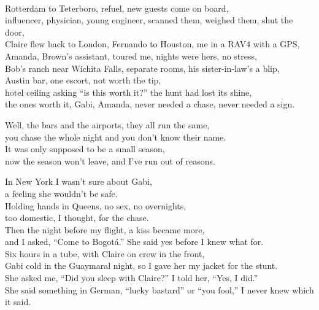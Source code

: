 \begin{lyrics}
\\
Rotterdam to Teterboro, refuel, new guests come on board,\\
influencer, physician, young engineer, scanned them, weighed them, shut the door,\\
Claire flew back to London, Fernando to Houston, me in a RAV4 with a GPS,\\
Amanda, Brown’s assistant, toured me, nights were hers, no stress,\\
Bob’s ranch near Wichita Falls, separate rooms, his sister-in-law’s a blip,\\
Austin bar, one escort, not worth the tip,\\
hotel ceiling asking “is this worth it?” the hunt had lost its shine,\\
the ones worth it, Gabi, Amanda, never needed a chase, never needed a sign.

Well, the bars and the airports, they all run the same,\\
you chase the whole night and you don’t know their name.\\
It was only supposed to be a small season,\\
now the season won’t leave, and I’ve run out of reasons.

In New York I wasn’t sure about Gabi,\\
a feeling she wouldn’t be safe.\\
Holding hands in Queens, no sex, no overnights,\\
too domestic, I thought, for the chase.\\
Then the night before my flight, a kiss became more,\\
and I asked, “Come to Bogotá.” She said yes before I knew what for.\\
Six hours in a tube, with Claire on crew in the front,\\
Gabi cold in the Guaymaral night, so I gave her my jacket for the stunt.\\
She asked me, “Did you sleep with Claire?” I told her, “Yes, I did.”\\
She said something in German, “lucky bastard” or “you fool,” I never knew which it said.


\end{lyrics}
